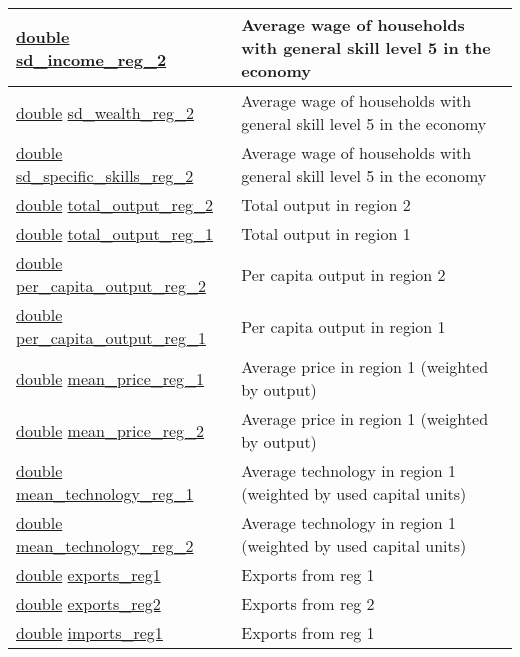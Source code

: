 \documentclass[a4paper,11pt]{article}
\begin{document}
\begin{longtable}[H!]{ll}
\midrule
\parbox{5cm}{\url{double} \url{sd_income_reg_2}}  & \parbox{10cm}{Average wage of households with general skill level 5 in the economy} \\
\midrule
\parbox{5cm}{\url{double} \url{sd_wealth_reg_2}}  & \parbox{10cm}{Average wage of households with general skill level 5 in the economy} \\
\midrule
\parbox{5cm}{\url{double} \url{sd_specific_skills_reg_2}}  & \parbox{10cm}{Average wage of households with general skill level 5 in the economy} \\
\midrule
\parbox{5cm}{\url{double} \url{total_output_reg_2}}  & \parbox{10cm}{Total output in region 2} \\
\midrule
\parbox{5cm}{\url{double} \url{total_output_reg_1}}  & \parbox{10cm}{Total output in region 1} \\
\midrule
\parbox{5cm}{\url{double} \url{per_capita_output_reg_2}}  & \parbox{10cm}{Per capita output in region 2} \\
\midrule
\parbox{5cm}{\url{double} \url{per_capita_output_reg_1}}  & \parbox{10cm}{Per capita output in region 1} \\
\midrule
\parbox{5cm}{\url{double} \url{mean_price_reg_1}}  & \parbox{10cm}{Average price in region 1 (weighted by output)} \\
\midrule
\parbox{5cm}{\url{double} \url{mean_price_reg_2}}  & \parbox{10cm}{Average price in region 1 (weighted by output)} \\
\midrule
\parbox{5cm}{\url{double} \url{mean_technology_reg_1}}  & \parbox{10cm}{Average technology in region 1 (weighted by used capital units)} \\
\midrule
\parbox{5cm}{\url{double} \url{mean_technology_reg_2}}  & \parbox{10cm}{Average technology in region 1 (weighted by used capital units)} \\
\midrule
\parbox{5cm}{\url{double} \url{exports_reg1}}  & \parbox{10cm}{Exports from reg 1} \\
\midrule
\parbox{5cm}{\url{double} \url{exports_reg2}}  & \parbox{10cm}{Exports from reg 2} \\
\midrule
\parbox{5cm}{\url{double} \url{imports_reg1}}  & \parbox{10cm}{Exports from reg 1} \\

\end{longtable}
\end{document}
